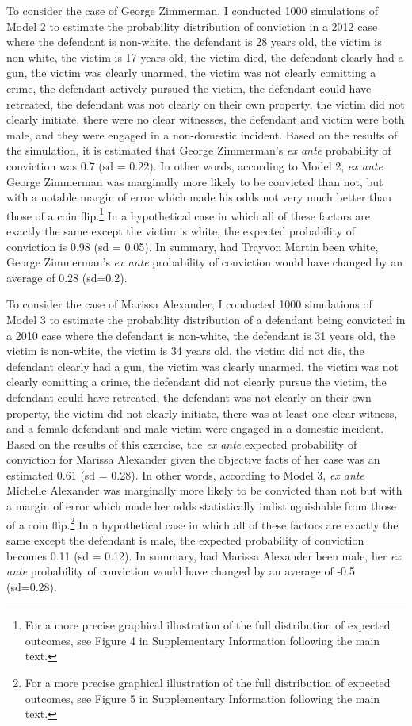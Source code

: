 \documentclass[12pt,article]{article}
\begin{document}
To consider the case of George Zimmerman, I conducted 1000 simulations
of Model 2 to estimate the probability distribution of conviction in a
2012 case where the defendant is non-white, the defendant is 28 years
old, the victim is non-white, the victim is 17 years old, the victim
died, the defendant clearly had a gun, the victim was clearly unarmed,
the victim was not clearly comitting a crime, the defendant actively
pursued the victim, the defendant could have retreated, the defendant
was not clearly on their own property, the victim did not clearly
initiate, there were no clear witnesses, the defendant and victim were
both male, and they were engaged in a non-domestic incident. Based on
the results of the simulation, it is estimated that George Zimmerman's
\emph{ex ante} probability of conviction was 0.7 (sd = 0.22). In other
words, according to Model 2, \emph{ex ante} George Zimmerman was
marginally more likely to be convicted than not, but with a notable
margin of error which made his odds not very much better than those of a
coin flip.\footnote{For a more precise graphical illustration of the
  full distribution of expected outcomes, see Figure 4 in Supplementary
  Information following the main text.} In a hypothetical case in which
all of these factors are exactly the same except the victim is white,
the expected probability of conviction is 0.98 (sd = 0.05). In summary,
had Trayvon Martin been white, George Zimmerman's \emph{ex ante}
probability of conviction would have changed by an average of 0.28
(sd=0.2).

To consider the case of Marissa Alexander, I conducted 1000 simulations
of Model 3 to estimate the probability distribution of a defendant being
convicted in a 2010 case where the defendant is non-white, the defendant
is 31 years old, the victim is non-white, the victim is 34 years old,
the victim did not die, the defendant clearly had a gun, the victim was
clearly unarmed, the victim was not clearly comitting a crime, the
defendant did not clearly pursue the victim, the defendant could have
retreated, the defendant was not clearly on their own property, the
victim did not clearly initiate, there was at least one clear witness,
and a female defendant and male victim were engaged in a domestic
incident. Based on the results of this exercise, the \emph{ex ante}
expected probability of conviction for Marissa Alexander given the
objective facts of her case was an estimated 0.61 (sd = 0.28). In other
words, according to Model 3, \emph{ex ante} Michelle Alexander was
marginally more likely to be convicted than not but with a margin of
error which made her odds statistically indistinguishable from those of
a coin flip.\footnote{For a more precise graphical illustration of the
  full distribution of expected outcomes, see Figure 5 in Supplementary
  Information following the main text.} In a hypothetical case in which
all of these factors are exactly the same except the defendant is male,
the expected probability of conviction becomes 0.11 (sd = 0.12). In
summary, had Marissa Alexander been male, her \emph{ex ante} probability
of conviction would have changed by an average of -0.5 (sd=0.28).
\end{document}
